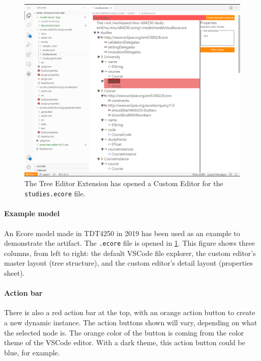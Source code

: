 \begin{figure}[H]  %
  \centering
  \includegraphics[width=\textwidth]{figures/gitpod-vscode-ecore-editor-studyemf.png}
  \caption[Tree Editor Extension showing studies.ecore]{The Tree Editor Extension has opened a Custom Editor for the \texttt{studies.ecore} file.}\label{fig:gitpod-ext-tree-ecore}
\end{figure}

\paragraph{Example model}
An \gls{Ecore} model made in \gls{TDT4250} in 2019 has been used as an example to demonstrate the artifact.
The \texttt{.ecore} file is opened in \cref{fig:gitpod-ext-tree-ecore}.
This figure shows three columns, from left to right: the default \gls{VSCode} file explorer, the custom editor's master layout (tree structure), and the custom editor's detail layout (properties sheet).

\paragraph{Action bar}
There is also a red action bar at the top, with an orange action button to create a new dynamic instance.
The action buttons shown will vary, depending on what the selected node is.
The orange color of the button is coming from the color theme of the \gls{VSCode} editor.
With a dark theme, this action button could be blue, for example.

